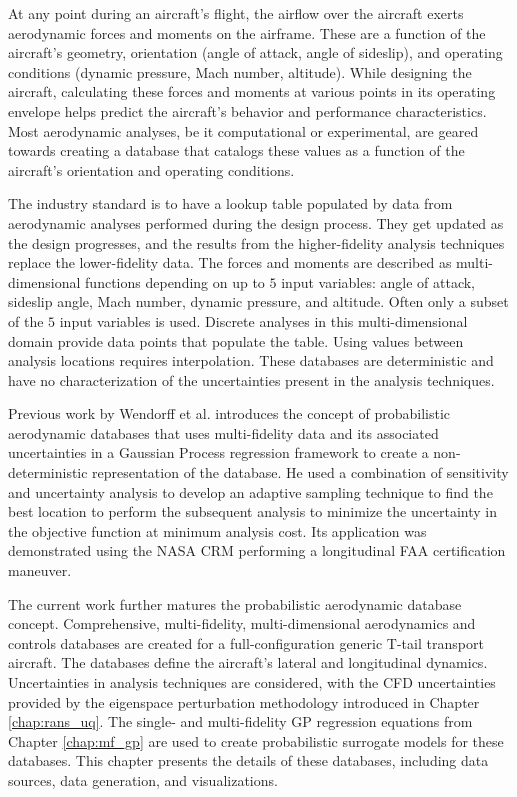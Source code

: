 At any point during an aircraft's flight, the airflow over the aircraft exerts aerodynamic forces and moments on the airframe.
These are a function of the aircraft's geometry, orientation (angle of attack, angle of sideslip), and operating conditions (dynamic pressure, Mach number, altitude).
While designing the aircraft, calculating these forces and moments at various points in its operating envelope helps predict the aircraft's behavior and performance characteristics.
Most aerodynamic analyses, be it computational or experimental, are geared towards creating a database that catalogs these values as a function of the aircraft's orientation and operating conditions.

The industry standard is to have a lookup table populated by data from aerodynamic analyses performed during the design process.
They get updated as the design progresses, and the results from the higher-fidelity analysis techniques replace the lower-fidelity data.
The forces and moments are described as multi-dimensional functions depending on up to $5$ input variables: angle of attack, sideslip angle, Mach number, dynamic pressure, and altitude.
Often only a subset of the $5$ input variables is used.
Discrete analyses in this multi-dimensional domain provide data points that populate the table. 
Using values between analysis locations requires interpolation.
These databases are deterministic and have no characterization of the uncertainties present in the analysis techniques. 

Previous work by Wendorff et al. \cite{wendorff_combining_2016} introduces the concept of probabilistic aerodynamic databases that uses multi-fidelity data and its associated uncertainties in a Gaussian Process regression framework to create a non-deterministic representation of the database.
He used a combination of sensitivity and uncertainty analysis to develop an adaptive sampling technique to find the best location to perform the subsequent analysis to minimize the uncertainty in the objective function at minimum analysis cost.
Its application was demonstrated using the NASA CRM performing a longitudinal FAA certification maneuver. 

The current work further matures the probabilistic aerodynamic database concept.
Comprehensive, multi-fidelity, multi-dimensional aerodynamics and controls databases are created for a full-configuration generic T-tail transport aircraft.
The databases define the aircraft's lateral and longitudinal dynamics.
Uncertainties in analysis techniques are considered, with the CFD uncertainties provided by the eigenspace perturbation methodology introduced in Chapter \ref{chap:rans_uq}.
The single- and multi-fidelity GP regression equations from Chapter \ref{chap:mf_gp} are used to create probabilistic surrogate models for these databases. 
This chapter presents the details of these databases, including data sources, data generation, and visualizations. 
